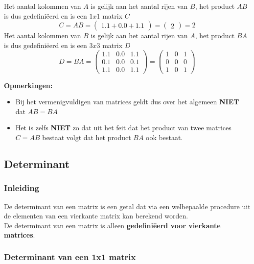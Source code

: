 \begin{enumerate}
\[	\]
	Het aantal kolommen van $A$ is gelijk aan het aantal rijen van $B$, het product $AB$ is dus gedefini\"{e}erd en is een $1x1$ matrix $C$
	\[ C=AB=\left( \begin{matrix} 1.1+0.0+1.1 \end{matrix} \right)=\left( \begin{matrix} 2 \end{matrix} \right)=2 \]
	Het aantal kolommen van $B$ is gelijk aan het aantal rijen van $A$, het product $BA$ is dus gedefini\"{e}erd en is een $3x3$ matrix $D$
	\[
	D=BA=\left( \begin{matrix} 1.1 & 0.0 & 1.1 \\ 0.1 & 0.0 & 0.1 \\  1.1 & 0.0 & 1.1 \end{matrix} \right)=\left( \begin{matrix} 1 & 0 & 1 \\ 0 & 0 & 0 \\  1 & 0 & 1 \end{matrix} \right)
	\]
\end{enumerate}

{\bf Opmerkingen:}

\begin{itemize}
\item Bij het vermenigvuldigen van matrices geldt dus over het algemeen {\bf NIET} dat $AB=BA$
\item Het is zelfs {\bf NIET} zo dat uit het feit dat het product van twee matrices $C=AB$ bestaat volgt dat het product $BA$ ook bestaat.
\end{itemize}

\subsection{Determinant}

\subsubsection{Inleiding}

De determinant van een matrix is een getal dat via een welbepaalde procedure uit de elementen van een vierkante matrix kan berekend worden.\\
De determinant van een matrix is alleen {\bf gedefini\"{e}erd voor vierkante matrices}.\\

\subsubsection{Determinant van een 1x1 matrix}

